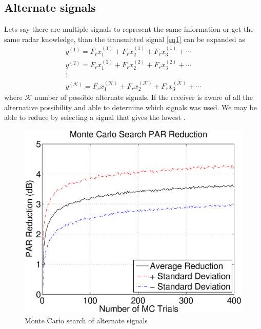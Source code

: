 \documentclass[conference]{IEEEtran}
\begin{document}
\subsection{Alternate signals}
Lets say there are multiple signals to represent the same information or get the same radar knowledge, than the transmitted signal \eqref{eq1} can be expanded as
\begin{gather*}
y^{(1)}=F_rx_1^{(1)}+F_rx_2^{(1)}+F_rx_3^{(1)}+\cdots \\
y^{(2)}=F_rx_1^{(2)}+F_rx_2^{(2)}+F_rx_3^{(2)}+\cdots \\
\vdots \\
y^{(\mathcal{K})}=F_rx_1^{(\mathcal{K})}+F_rx_2^{(\mathcal{K})}+F_rx_3^{(\mathcal{K})}+\cdots
\end{gather*}
where $\mathcal{K}$ number of possible alternate signals. If the receiver is aware of all the alternative possibility and able to determine which signals was used.  We may be able to reduce \PAR by selecting a signal that gives the lowest \PAR.  
\begin{figure}
\includegraphics[width=\linewidth]{MCFig.eps}
\caption{Monte Cario search of alternate signals}
\end{figure}





\end{document}
